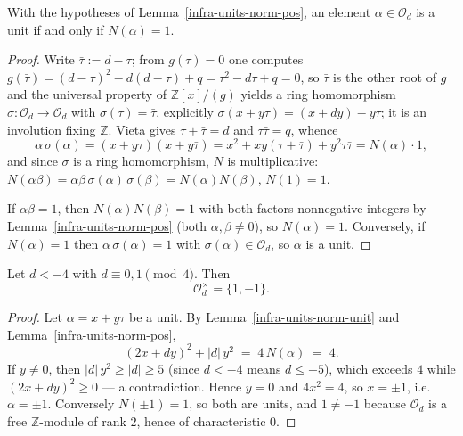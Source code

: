 \begin{lemma}\label{infra-units-norm-unit}
  With the hypotheses of Lemma~\ref{infra-units-norm-pos}, an element
  $\alpha \in \mathcal{O}_d$ is a unit if and only if $N(\alpha) = 1$.
\end{lemma}

\begin{proof}
  Write $\bar\tau := d - \tau$; from $g(\tau) = 0$ one computes
  $g(\bar\tau) = (d-\tau)^2 - d(d-\tau) + q = \tau^2 - d\tau + q = 0$, so
  $\bar\tau$ is the other root of $g$ and the universal property of
  $\mathbb{Z}[x]/(g)$ yields a ring homomorphism
  $\sigma : \mathcal{O}_d \to \mathcal{O}_d$ with $\sigma(\tau) = \bar\tau$,
  explicitly $\sigma(x+y\tau) = (x+dy) - y\tau$; it is an involution fixing
  $\mathbb{Z}$. Vieta gives $\tau + \bar\tau = d$ and $\tau\bar\tau = q$, whence
  \[
    \alpha\,\sigma(\alpha)
      = (x+y\tau)(x+y\bar\tau)
      = x^2 + xy(\tau + \bar\tau) + y^2\tau\bar\tau
      = N(\alpha)\cdot 1 ,
  \]
  and since $\sigma$ is a ring homomorphism, $N$ is multiplicative:
  $N(\alpha\beta) = \alpha\beta\,\sigma(\alpha)\,\sigma(\beta) = N(\alpha)N(\beta)$,
  $N(1) = 1$.

  If $\alpha\beta = 1$, then $N(\alpha)N(\beta) = 1$ with both factors
  nonnegative integers by Lemma~\ref{infra-units-norm-pos} (both $\alpha, \beta
  \neq 0$), so $N(\alpha) = 1$. Conversely, if $N(\alpha) = 1$ then
  $\alpha\,\sigma(\alpha) = 1$ with $\sigma(\alpha) \in \mathcal{O}_d$, so
  $\alpha$ is a unit.
\end{proof}

\begin{theorem}\label{infra-units}
  \leanok
  Let $d < -4$ with $d \equiv 0, 1 \pmod 4$. Then
  \[
    \mathcal{O}_d^\times = \{1, -1\} .
  \]
\end{theorem}

\begin{proof}
  Let $\alpha = x + y\tau$ be a unit. By Lemma~\ref{infra-units-norm-unit} and
  Lemma~\ref{infra-units-norm-pos},
  \[
    (2x + dy)^2 + |d|\,y^2 \;=\; 4\,N(\alpha) \;=\; 4 .
  \]
  If $y \neq 0$, then $|d|\,y^2 \ge |d| \ge 5$ (since $d < -4$ means $d \le -5$),
  which exceeds $4$ while $(2x+dy)^2 \ge 0$ — a contradiction. Hence $y = 0$ and
  $4x^2 = 4$, so $x = \pm 1$, i.e.\ $\alpha = \pm 1$. Conversely $N(\pm 1) = 1$,
  so both are units, and $1 \neq -1$ because $\mathcal{O}_d$ is a free
  $\mathbb{Z}$-module of rank $2$, hence of characteristic $0$.
\end{proof}

